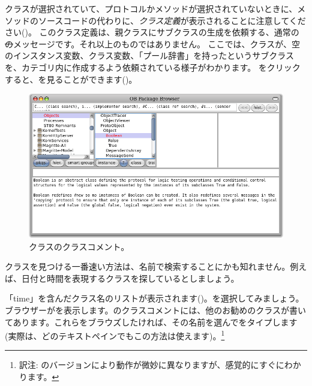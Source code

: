 \documentclass[a4paper,10pt,twoside]{book}
\begin{document}
 クラスが選択されていて、プロトコルかメソッドが選択されていないときに、メソッドのソースコードの代わりに、\emph{クラス定義}が表示されることに注意してください()。
このクラス定義は、親クラスにサブクラスの生成を依頼する、通常の \st のメッセージです。それ以上のものではありません。
ここでは、クラスが、空のインスタンス変数、クラス変数、「プール辞書」を持ったというサブクラスを、カテゴリ内に作成するよう依頼されている様子がわかります。
 をクリックすると、を見ることができます()。

\begin{figure}[hbt]
\centerline {\includegraphics[width=\textwidth]{classComment}}
\caption{クラスのクラスコメント。
}
\end{figure}

クラスを見つける一番速い方法は、名前で検索することにかも知れません。例えば、日付と時間を表現するクラスを探しているとしましょう。

\noindent
「time」を含んだクラス名のリストが表示されます()。を選択してみましょう。ブラウザーがを表示します。のクラスコメントには、他のお勧めのクラスが書いてあります。これらをブラウズしたければ、その名前を選んでをタイプします(実際は、どのテキストペインでもこの方法は使えます)。\footnote{訳注: \pharo のバージョンにより動作が微妙に異なりますが、感覚的にすぐにわかります。}
\end{document}
